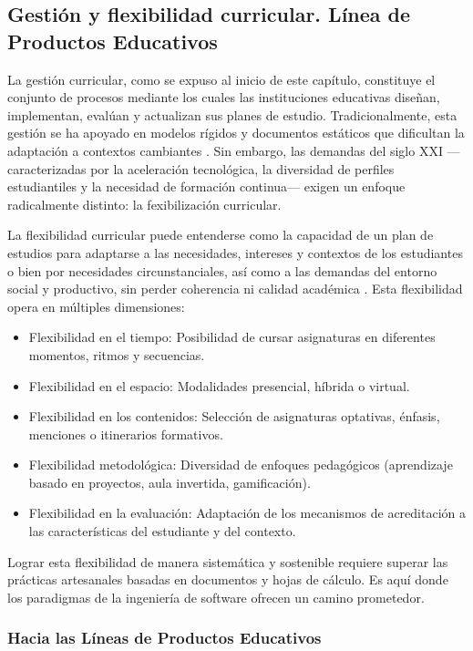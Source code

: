 \subsection{Gestión y flexibilidad curricular. Línea de Productos Educativos}

La gestión curricular, como se expuso al inicio de este capítulo, constituye el 
conjunto de procesos mediante los cuales las instituciones educativas diseñan, 
implementan, evalúan y actualizan sus planes de estudio. Tradicionalmente, esta gestión 
se ha apoyado en modelos rígidos y documentos estáticos que dificultan la adaptación a 
contextos cambiantes \citep{gomez2023}. Sin embargo, las demandas del siglo 
XXI —caracterizadas por la aceleración tecnológica, la diversidad de perfiles estudiantiles 
y la necesidad de formación continua— exigen un enfoque radicalmente 
distinto: la fexibilización curricular.

La flexibilidad curricular puede entenderse como la capacidad de un plan de 
estudios para adaptarse a las necesidades, intereses y contextos de los estudiantes o bien por 
necesidades circunstanciales, así como a las demandas del entorno social y productivo, sin perder coherencia ni calidad 
académica \citep{diaz2002flexibilidad}. Esta flexibilidad opera en múltiples dimensiones:
\begin{itemize}
    \item Flexibilidad en el tiempo: Posibilidad de cursar asignaturas en diferentes momentos, ritmos y secuencias.
    \item Flexibilidad en el espacio: Modalidades presencial, híbrida o virtual.
    \item Flexibilidad en los contenidos: Selección de asignaturas optativas, énfasis, menciones o itinerarios formativos.
    \item Flexibilidad metodológica: Diversidad de enfoques pedagógicos (aprendizaje basado en proyectos, aula invertida, gamificación).
    \item Flexibilidad en la evaluación: Adaptación de los mecanismos de acreditación a las características del estudiante y del contexto.
\end{itemize}

Lograr esta flexibilidad de manera sistemática y sostenible requiere superar las 
prácticas artesanales basadas en documentos y hojas de cálculo. Es aquí donde los 
paradigmas de la ingeniería de software ofrecen un camino prometedor.

\subsubsection{Hacia las Líneas de Productos Educativos}

